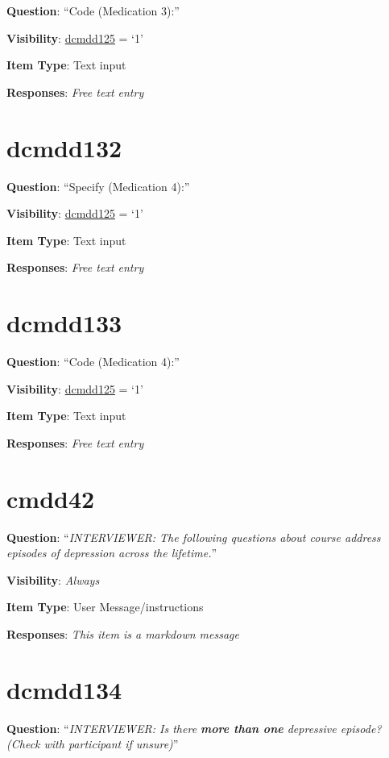 \documentclass[]{book}
\begin{document}
\textbf{Question}: ``Code (Medication 3):''

\textbf{Visibility}: \protect\hyperlink{dcmdd125}{dcmdd125} = `1'

\textbf{Item Type}: Text input

\textbf{Responses}: \emph{Free text entry}

\hypertarget{dcmdd132}{%
\section{dcmdd132}\label{dcmdd132}}

\textbf{Question}: ``Specify (Medication 4):''

\textbf{Visibility}: \protect\hyperlink{dcmdd125}{dcmdd125} = `1'

\textbf{Item Type}: Text input

\textbf{Responses}: \emph{Free text entry}

\hypertarget{dcmdd133}{%
\section{dcmdd133}\label{dcmdd133}}

\textbf{Question}: ``Code (Medication 4):''

\textbf{Visibility}: \protect\hyperlink{dcmdd125}{dcmdd125} = `1'

\textbf{Item Type}: Text input

\textbf{Responses}: \emph{Free text entry}

\hypertarget{cmdd42}{%
\section{cmdd42}\label{cmdd42}}

\textbf{Question}: ``\emph{INTERVIEWER: The following questions about course address episodes of depression across the lifetime.}''

\textbf{Visibility}: \emph{Always}

\textbf{Item Type}: User Message/instructions

\textbf{Responses}: \emph{This item is a markdown message}

\hypertarget{dcmdd134}{%
\section{dcmdd134}\label{dcmdd134}}

\textbf{Question}: ``\emph{INTERVIEWER: Is there \textbf{more than one} depressive episode? (Check with participant if unsure)}''
\end{document}
